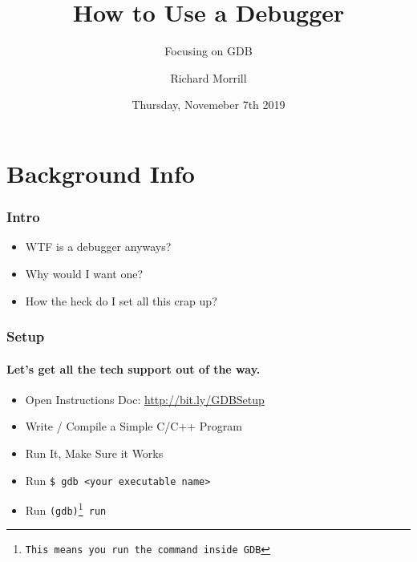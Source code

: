 \documentclass[aspectratio=169]{beamer}
\title{How to Use a Debugger}
\subtitle{Focusing on GDB}
\author{Richard Morrill}
\institute{Fordham University CS Society}
\date{Thursday, Novemeber 7th 2019}
\newcommand{\code}{\texttt}
\begin{document}
\begin{frame}
\titlepage
\end{frame}

\section{Background Info}
\begin{frame}
    \frametitle{Intro}

    \begin{itemize}
        \item WTF is a debugger anyways?
        \item Why would I want one?
        \item How the heck do I set all this crap up?
    \end{itemize}
\end{frame}

\begin{frame}
    \frametitle{Setup}
    \framesubtitle{Let's get all the tech support out of the way.}
    \begin{itemize}
        \item Open Instructions Doc: \url{http://bit.ly/GDBSetup}
        \item Write / Compile a Simple C/C++ Program
        \item Run It, Make Sure it Works
        \item Run \code{\$ gdb <your executable name>}
        \item Run \code{(gdb)\footnote[frame]{This means you run the command inside GDB} run}
    \end{itemize}

\end{frame}
\end{document}
